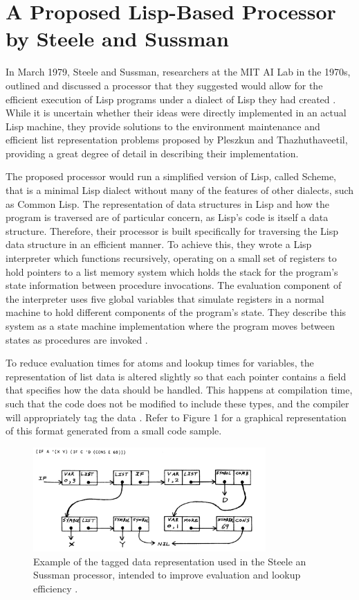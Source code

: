\documentclass[journal]{IEEEtran}
\begin{document}
\section{A Proposed Lisp-Based Processor by Steele and Sussman}
In March 1979, Steele and Sussman, researchers at the MIT AI Lab in the 1970s, outlined and discussed a processor that they suggested would allow for the efficient execution of Lisp programs under a dialect of Lisp they had created \cite{ss}. While it is uncertain whether their ideas were directly implemented in an actual Lisp machine, they provide solutions to the environment maintenance and efficient list representation problems proposed by Pleszkun and Thazhuthaveetil, providing a great degree of detail in describing their implementation.

The proposed processor would run a simplified version of Lisp, called Scheme, that is a minimal Lisp dialect without many of the features of other dialects, such as Common Lisp. The representation of data structures in Lisp and how the program is traversed are of particular concern, as Lisp's code is itself a data structure. Therefore, their processor is built specifically for traversing the Lisp data structure in an efficient manner. To achieve this, they wrote a Lisp interpreter which functions recursively, operating on a small set of registers to hold pointers to a list memory system which holds the stack for the program's state information between procedure invocations. The evaluation component of the interpreter uses five global variables that simulate registers in a normal machine to hold different components of the program's state. They describe this system as a state machine implementation where the program moves between states as procedures are invoked \cite{ss}.

To reduce evaluation times for atoms and lookup times for variables, the representation of list data is altered slightly so that each pointer contains a field that specifies how the data should be handled. This happens at compilation time, such that the code does not be modified to include these types, and the compiler will appropriately tag the data \cite{ss}. Refer to Figure 1 for a graphical representation of this format generated from a small code sample.

\begin{figure}[!t]
	\centering
	\includegraphics[width=3.5in]{SS_Data_Representation}
	\caption{Example of the tagged data representation used in the Steele an Sussman processor, intended to improve evaluation and lookup efficiency \cite{ss}.}
	\label{Data representation}
\end{figure}
\end{document}

